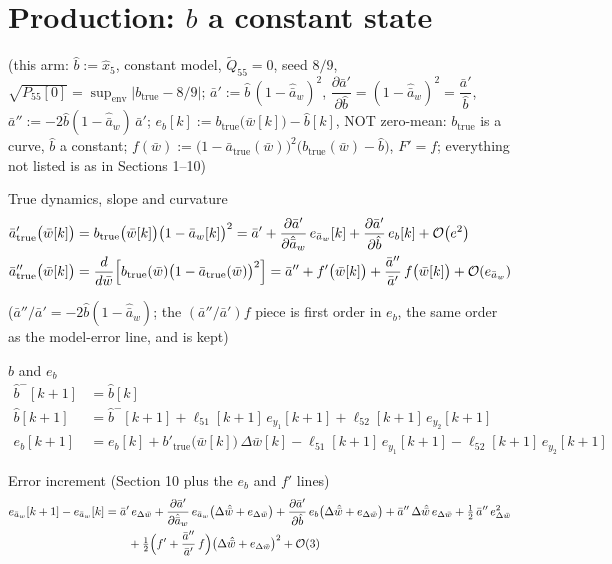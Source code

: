 \documentclass[11pt,a4paper,fontset=none]{ctexart}
\newcommand{\ba}{\bar{a}}
\newcommand{\bw}{\bar{w}}
\newcommand{\dW}{\Delta\bw}
\newcommand{\dWh}{\Delta\hat{\bw}}
\newcommand{\eD}{e_{\Delta\bw}}
\newcommand{\ap}{\ba'}
\newcommand{\app}{\ba''}
\begin{document}
\clearpage
\section{Production: $b$ a constant state}

(this arm: $\hat{b} := \hat{x}_5$, constant model, $\tilde{Q}_{55} = 0$, seed $8/9$, $\sqrt{P_{55}[0]} = \sup_{\text{env}}|b_{\mathrm{true}} - 8/9|$;
$\ap := \hat{b}\,(1 - \hat{\ba}_w)^{2}$, $\dfrac{\partial\ap}{\partial\hat{b}} = (1 - \hat{\ba}_w)^{2} = \dfrac{\ap}{\hat{b}}$, $\app := -2\hat{b}(1-\hat{\ba}_w)\,\ap$;
$e_b[k] := b_{\mathrm{true}}\bigl(\bw[k]\bigr) - \hat{b}[k]$, NOT zero-mean: $b_{\mathrm{true}}$ is a curve, $\hat{b}$ a constant;
$f(\bw) := \bigl(1 - \ba_{\mathrm{true}}(\bw)\bigr)^{2}\bigl(b_{\mathrm{true}}(\bw) - \hat{b}\bigr)$, $F' = f$;
everything not listed is as in Sections 1--10)

True dynamics, slope and curvature
\begin{align*}
\ap_{\mathrm{true}}\bigl(\bw[k]\bigr) &= b_{\mathrm{true}}\bigl(\bw[k]\bigr)\bigl(1 - \ba_w[k]\bigr)^{2}
  = \ap + \frac{\partial\ap}{\partial\hat{\ba}_w}\,e_{\ba_w}[k] + \frac{\partial\ap}{\partial\hat{b}}\,e_b[k] + \mathcal{O}\bigl(e^{2}\bigr) \\
\app_{\mathrm{true}}\bigl(\bw[k]\bigr) &= \frac{d}{d\bw}\Bigl[b_{\mathrm{true}}(\bw)\bigl(1 - \ba_{\mathrm{true}}(\bw)\bigr)^{2}\Bigr]
  = \app + f'\bigl(\bw[k]\bigr) + \frac{\app}{\ap}\,f\bigl(\bw[k]\bigr) + \mathcal{O}(e_{\ba_w})
\end{align*}

($\app/\ap = -2\hat{b}(1-\hat{\ba}_w)$; the $(\app/\ap)f$ piece is first order in $e_b$, the same order as the model-error line, and is kept)

$\hat{b}$ and $e_b$
\begin{align*}
\hat{b}^{-}[k+1] &= \hat{b}[k] \\
\hat{b}[k+1] &= \hat{b}^{-}[k+1] + \ell_{51}[k+1]\,e_{y_1}[k+1] + \ell_{52}[k+1]\,e_{y_2}[k+1] \\
e_b[k+1] &= e_b[k] + b'_{\mathrm{true}}\bigl(\bw[k]\bigr)\,\dW[k] - \ell_{51}[k+1]\,e_{y_1}[k+1] - \ell_{52}[k+1]\,e_{y_2}[k+1]
\end{align*}

Error increment (Section 10 plus the $e_b$ and $f'$ lines)
\begin{align*}
e_{\ba_w}[k+1] - e_{\ba_w}[k]
  &= \ap\,\eD
     + \frac{\partial\ap}{\partial\hat{\ba}_w}\,e_{\ba_w}\bigl(\dWh + \eD\bigr)
     + \frac{\partial\ap}{\partial\hat{b}}\,e_b\bigl(\dWh + \eD\bigr)
     + \app\,\dWh\,\eD
     + \tfrac{1}{2}\,\app\,\eD^{2} \\
  &\qquad + \tfrac{1}{2}\Bigl(f' + \frac{\app}{\ap}\,f\Bigr)\bigl(\dWh + \eD\bigr)^{2}
     + \mathcal{O}(3)
\end{align*}
\end{document}
